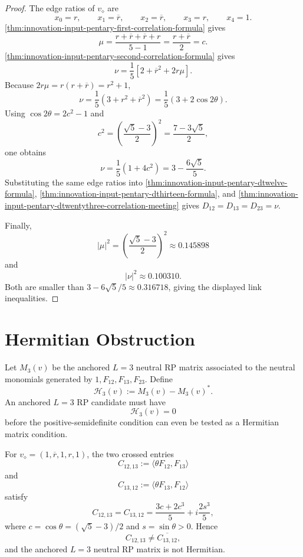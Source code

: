 \begin{proof}
The edge ratios of $v_\diamond$ are
$$
x_0=r,
\qquad
x_1=\overline r,
\qquad
x_2=\overline r,
\qquad
x_3=r,
\qquad
x_4=1.
$$
\autoref{thm:innovation-input-pentary-first-correlation-formula} gives
$$
\mu
=
\frac{r+\overline r+\overline r+r}{5-1}
=
\frac{r+\overline r}{2}
=
c.
$$
\autoref{thm:innovation-input-pentary-second-correlation-formula} gives
$$
\nu
=
\frac15
\left[
2+\overline r^2+2r\mu
\right].
$$
Because $2r\mu=r(r+\overline r)=r^2+1$,
$$
\nu
=
\frac15(3+r^2+\overline r^2)
=
\frac15(3+2\cos2\theta).
$$
Using $\cos2\theta=2c^2-1$ and
$$
c^2
=
\left(\frac{\sqrt5-3}{2}\right)^2
=
\frac{7-3\sqrt5}{2},
$$
one obtains
$$
\nu
=
\frac15(1+4c^2)
=
3-\frac{6\sqrt5}{5}.
$$
Substituting the same edge ratios into
\autoref{thm:innovation-input-pentary-dtwelve-formula},
\autoref{thm:innovation-input-pentary-dthirteen-formula}, and
\autoref{thm:innovation-input-pentary-dtwentythree-correlation-meeting}
gives $D_{12}=D_{13}=D_{23}=\nu$.

Finally,
$$
|\mu|^2
=
\left(\frac{\sqrt5-3}{2}\right)^2
\approx0.145898
$$
and
$$
|\nu|^2\approx0.100310.
$$
Both are smaller than
$3-6\sqrt5/5\approx0.316718$, giving the displayed link inequalities.
\end{proof}

\section{Hermitian Obstruction}
\label{sec:innovation-input-pentary-hermitian-obstruction}

\begin{definition}[Anchored $L=3$ Hermitian defect]
\label{def:innovation-input-anchored-lthree-hermitian-defect}
Let $M_3(v)$ be the anchored $L=3$ neutral RP matrix associated to the
neutral monomials generated by $1,F_{12},F_{13},F_{23}$. Define
$$
\mathcal H_3(v):=M_3(v)-M_3(v)^*.
$$
An anchored $L=3$ RP candidate must have
$$
\mathcal H_3(v)=0
$$
before the positive-semidefinite condition can even be tested as a
Hermitian matrix condition.
\end{definition}

\begin{theorem}
\label{thm:innovation-input-golden-symmetric-hermitian-obstruction}
For $v_\diamond=(1,\overline r,1,r,1)$, the two crossed entries
$$
C_{12,13}:=\langle\theta F_{12},F_{13}\rangle
$$
and
$$
C_{13,12}:=\langle\theta F_{13},F_{12}\rangle
$$
satisfy
$$
C_{12,13}=C_{13,12}
=
\frac{3c+2c^3}{5}
+i\frac{2s^3}{5},
$$
where $c=\cos\theta=(\sqrt5-3)/2$ and $s=\sin\theta>0$. Hence
$$
C_{12,13}\ne\overline{C_{13,12}},
$$
and the anchored $L=3$ neutral RP matrix is not Hermitian.
\end{theorem}


